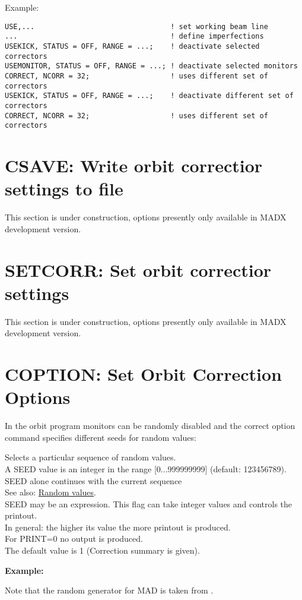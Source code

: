 Example:
\begin{verbatim}
USE,...                                ! set working beam line 
...                                    ! define imperfections 
USEKICK, STATUS = OFF, RANGE = ...;    ! deactivate selected correctors 
USEMONITOR, STATUS = OFF, RANGE = ...; ! deactivate selected monitors   
CORRECT, NCORR = 32;                   ! uses different set of correctors
USEKICK, STATUS = OFF, RANGE = ...;    ! deactivate different set of correctors 
CORRECT, NCORR = 32;                   ! uses different set of correctors
\end{verbatim}


%
\section{CSAVE: Write orbit correctior settings to file}
\label{sec:csave}
 This section is under construction, options presently only available in
 MADX development version.  

\section{SETCORR: Set orbit correctior settings}
 This section is under construction, options presently only available in
 MADX development version.  


% 
\section{COPTION: Set Orbit Correction Options}  
\label{sec:correction_options}


In the orbit program monitors can be randomly disabled and the correct
option command specifies different seeds for random values:  

\begin{madlist}
    Selects a particular sequence of random values. 
     \\ A SEED value is an integer in the range [0...999999999] (default: 123456789). 
     \\ SEED alone continues with the current sequence 
     \\ See also: \href{../Introduction/expression.html#random}{Random values}. 
     \\ SEED may be an expression. 
    This flag can take integer values and controls the printout. 
     \\ In general: the higher its value the more printout is produced.  
     \\ For PRINT=0 no output is produced. 
     \\ The default value is 1 (Correction summary is given). 
\end{madlist}

{\bf Example:}

Note that the random generator for MAD is taken from \cite{knuth1981}.





